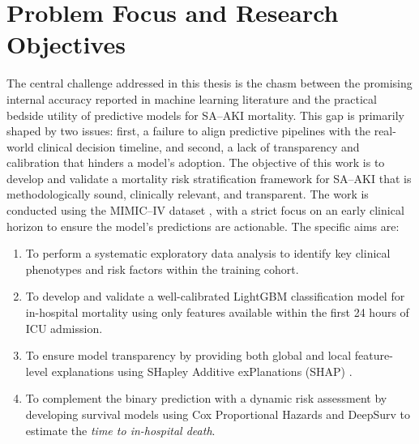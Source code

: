 \section{Problem Focus and Research Objectives} The central challenge addressed in this thesis is the chasm between the promising internal accuracy reported in machine learning literature and the practical bedside utility of predictive models for SA--AKI mortality. This gap is primarily shaped by two issues: first, a failure to align predictive pipelines with the real-world clinical decision timeline, and second, a lack of transparency and calibration that hinders a model's adoption. The objective of this work is to develop and validate a mortality risk stratification framework for SA--AKI that is methodologically sound, clinically relevant, and transparent. The work is conducted using the MIMIC--IV dataset \citep{Johnson_2023_MIMIC}, with a strict focus on an early clinical horizon to ensure the model's predictions are actionable. The specific aims are: \begin{enumerate} \item To perform a systematic exploratory data analysis to identify key clinical phenotypes and risk factors within the training cohort. \item To develop and validate a well-calibrated LightGBM classification model for in-hospital mortality using only features available within the first 24 hours of ICU admission. \item To ensure model transparency by providing both global and local feature-level explanations using SHapley Additive exPlanations (SHAP) \citep{Lundberg_Lee_2017}. \item To complement the binary prediction with a dynamic risk assessment by developing survival models using Cox Proportional Hazards and DeepSurv to estimate the \emph{time to in-hospital death}. \end{enumerate}

